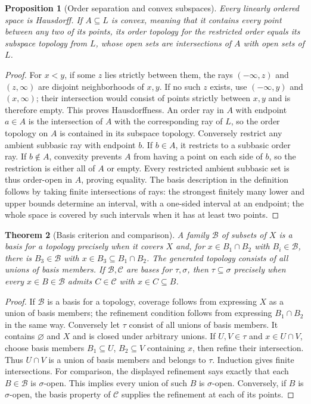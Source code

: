\documentclass[11pt,oneside,openany]{book}
\newtheorem{theorem}{Theorem}[chapter]
\newtheorem{proposition}[theorem]{Proposition}
\theoremstyle{definition}
\theoremstyle{remark}
\newcommand{\BB}{\mathcal B}\newcommand{\FF}{\mathcal F}
\begin{document}
\begin{proposition}[Order separation and convex subspaces]\label{d10:01:ordered-spaces}
Every linearly ordered space is Hausdorff. If $A\subseteq L$ is convex, meaning that it contains every point between any two of its points, its order topology for the restricted order equals its subspace topology from $L$, whose open sets are intersections of $A$ with open sets of $L$.
\end{proposition}
\begin{proof}
For $x<y$, if some $z$ lies strictly between them, the rays $(-\infty,z)$ and $(z,\infty)$ are disjoint neighborhoods of $x,y$. If no such $z$ exists, use $(-\infty,y)$ and $(x,\infty)$; their intersection would consist of points strictly between $x,y$ and is therefore empty. This proves Hausdorffness. An order ray in $A$ with endpoint $a\in A$ is the intersection of $A$ with the corresponding ray of $L$, so the order topology on $A$ is contained in its subspace topology. Conversely restrict any ambient subbasic ray with endpoint $b$. If $b\in A$, it restricts to a subbasic order ray. If $b\notin A$, convexity prevents $A$ from having a point on each side of $b$, so the restriction is either all of $A$ or empty. Every restricted ambient subbasic set is thus order-open in $A$, proving equality. The basis description in the definition follows by taking finite intersections of rays: the strongest finitely many lower and upper bounds determine an interval, with a one-sided interval at an endpoint; the whole space is covered by such intervals when it has at least two points.
\end{proof}
\begin{theorem}[Basis criterion and comparison]\label{d10:01:basis}
A family $\BB$ of subsets of $X$ is a basis for a topology precisely when it covers $X$ and, for $x\in B_1\cap B_2$ with $B_i\in\BB$, there is $B_3\in\BB$ with $x\in B_3\subseteq B_1\cap B_2$. The generated topology consists of all unions of basis members. If $\BB,\mathcal C$ are bases for $\tau,\sigma$, then $\tau\subseteq\sigma$ precisely when every $x\in B\in\BB$ admits $C\in\mathcal C$ with $x\in C\subseteq B$.
\end{theorem}
\begin{proof}
If $\BB$ is a basis for a topology, coverage follows from expressing $X$ as a union of basis members; the refinement condition follows from expressing $B_1\cap B_2$ in the same way. Conversely let $\tau$ consist of all unions of basis members. It contains $\varnothing$ and $X$ and is closed under arbitrary unions. If $U,V\in\tau$ and $x\in U\cap V$, choose basis members $B_1\subseteq U$, $B_2\subseteq V$ containing $x$, then refine their intersection. Thus $U\cap V$ is a union of basis members and belongs to $\tau$. Induction gives finite intersections. For comparison, the displayed refinement says exactly that each $B\in\BB$ is $\sigma$-open. This implies every union of such $B$ is $\sigma$-open. Conversely, if $B$ is $\sigma$-open, the basis property of $\mathcal C$ supplies the refinement at each of its points.
\end{proof}
\end{document}
